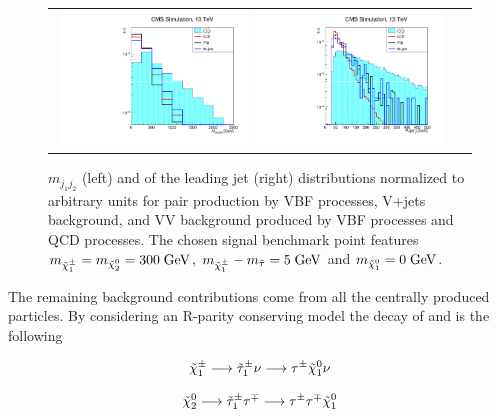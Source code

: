 \begin{figure}[tbh!]
	\centering
	\begin{tabular}{cc}
		\includegraphics[width=0.48\textwidth]{analysis/pics/h_dijetinvariantmass_prospects13tev.pdf}
		\includegraphics[width=0.48\textwidth]{analysis/pics/h_jet1pt_prospects13tev.pdf} 		
	\end{tabular}
	\caption{\ensuremath{m_{j_{1}j_{2}}} (left) and \pt of the leading jet (right) distributions normalized to arbitrary units for \charginopm \charginopm pair production by VBF processes, V+jets background, and VV background produced by VBF processes and QCD processes. The chosen signal benchmark point features \ensuremath{m_{\charginopm} = m_{\neutralinotwo} = 300\gev}, \ensuremath{m_{\charginopm} - m_{\tilde{\tau}} = 5\gev} and \ensuremath{m_{\neutralinoone} = 0\gev}.}
	\label{fig:VBF_mjj_ptj1}
\end{figure}


The remaining background contributions come from all the centrally produced particles. By considering an R-parity conserving model the decay of \charginopm and \neutralinotwo is the following

\begin{equation}
 \tilde{\chi}^{\pm}_{1} \longrightarrow \tilde{\tau}_{1}^{\pm} \nu \longrightarrow \tau^{\pm} \tilde{\chi}^{0}_{1} \nu
\end{equation}

\begin{equation}
\tilde{\chi}^{0}_{2} \longrightarrow \tilde{\tau}_{1}^{\pm} \tau^{\mp} \longrightarrow \tau^{\pm} \tau^{\mp} \tilde{\chi}^{0}_{1}
\end{equation}

